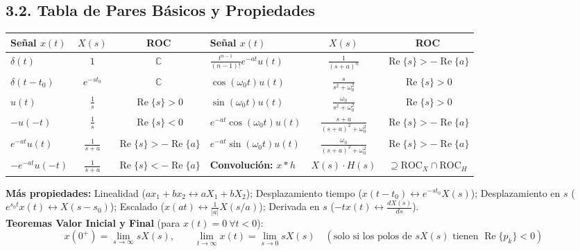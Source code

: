 \documentclass[10pt,a4paper]{article}
\begin{document}
	\subsection*{3.2. Tabla de Pares Básicos y Propiedades}
	\begin{center}
		\begin{tabular}{|l|c|c||l|c|c|}
			\hline
			\textbf{Señal $x(t)$} & \textbf{$X(s)$} & \textbf{ROC} & \textbf{Señal $x(t)$} & \textbf{$X(s)$} & \textbf{ROC} \\
			\hline
			$\delta(t)$ & $1$ & $\mathbb{C}$ & $\frac{t^{n-1}}{(n-1)!}e^{-at}u(t)$ & $\frac{1}{(s+a)^n}$ & $\operatorname{Re}\{s\} > -\operatorname{Re}\{a\}$ \\
			$\delta(t-t_0)$ & $e^{-st_0}$ & $\mathbb{C}$ & $\cos(\omega_0 t)u(t)$ & $\frac{s}{s^2+\omega_0^2}$ & $\operatorname{Re}\{s\} > 0$ \\
			$u(t)$ & $\frac{1}{s}$ & $\operatorname{Re}\{s\} > 0$ & $\sin(\omega_0 t)u(t)$ & $\frac{\omega_0}{s^2+\omega_0^2}$ & $\operatorname{Re}\{s\} > 0$ \\
			$-u(-t)$ & $\frac{1}{s}$ & $\operatorname{Re}\{s\} < 0$ & $e^{-at}\cos(\omega_0 t)u(t)$ & $\frac{s+a}{(s+a)^2+\omega_0^2}$ & $\operatorname{Re}\{s\} > -\operatorname{Re}\{a\}$ \\
			$e^{-at}u(t)$ & $\frac{1}{s+a}$ & $\operatorname{Re}\{s\} > -\operatorname{Re}\{a\}$ & $e^{-at}\sin(\omega_0 t)u(t)$ & $\frac{\omega_0}{(s+a)^2+\omega_0^2}$ & $\operatorname{Re}\{s\} > -\operatorname{Re}\{a\}$ \\
			$-e^{-at}u(-t)$ & $\frac{1}{s+a}$ & $\operatorname{Re}\{s\} < -\operatorname{Re}\{a\}$ & \textbf{Convolución:} $x*h$ & $X(s)\cdot H(s)$ & $\supseteq \text{ROC}_X \cap \text{ROC}_H$ \\
			\hline
		\end{tabular}
	\end{center}
	\textbf{Más propiedades:} Linealidad ($ax_1+bx_2 \leftrightarrow aX_1+bX_2$); Desplazamiento tiempo ($x(t-t_0) \leftrightarrow e^{-st_0}X(s)$); Desplazamiento en $s$ ($e^{s_0 t}x(t) \leftrightarrow X(s-s_0)$); Escalado ($x(at) \leftrightarrow \frac{1}{|a|}X(s/a)$); Derivada en $s$ ($-tx(t) \leftrightarrow \frac{dX(s)}{ds}$). \\
	\textbf{Teoremas Valor Inicial y Final} (para $x(t)=0 \ \forall t<0$):
	$$x(0^+) = \lim_{s\to\infty} sX(s), \qquad \lim_{t\to\infty} x(t) = \lim_{s\to 0} sX(s) \quad (\text{solo si los polos de } sX(s) \text{ tienen } \operatorname{Re}\{p_k\} < 0)$$
	
\end{document}
